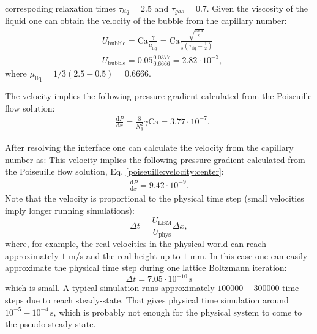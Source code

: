 \documentclass[preprint,12pt]{elsarticle}
\newcommand{\Ca}{\mathrm{Ca}}
\begin{document}
{\begin{description}
correspoding relaxation times $\tau_{liq}=2.5$ and $\tau_{gas}=0.7$. Given the viscosity of the
liquid one can obtain the velocity of the bubble from the capillary number: 
\begin{equation}
\begin{aligned}
&U_{\mathrm{bubble}}=\Ca \frac{\gamma}{\mu_{\mathrm{liq}}}=\Ca \frac{\sqrt{\frac{8 k
A}{9}}}{\frac{1}{3}(\tau_{\mathrm{liq}}-\frac{1}{2})}\\
&U_{\mathrm{bubble}}=0.05 \frac{0.0377}{0.6666}=2.82 \cdot10^{-3},
\end{aligned}
\end{equation}
where $\mu_{\mathrm{liq}}=1/3 (2.5-0.5)=0.6666$.
\item[Body force] 
  The velocity implies the following pressure gradient calculated from the
  Poiseuille flow solution:
  \begin{equation}
  \begin{aligned}
  &\frac{\mathrm{d}P}{\mathrm{d}x}=\frac{8}{N_y^2}\gamma \Ca=3.77\cdot10^{-7}.
  \end{aligned}
  \end{equation}

After resolving the interface one can  calculate the
  velocity from the capillary number as:
  This velocity implies the following pressure gradient calculated from the
  Poiseuille flow solution, Eq. \ref{poiseuille:velocity:center}: 
  \begin{equation}
  \begin{aligned}
  \frac{\mathrm{d}P}{\mathrm{d}x}=9.42 \cdot 10^{-9}.
  \end{aligned}
  \end{equation}
Note that the velocity is proportional to the physical time step (small velocities imply longer
running
simulations):
\begin{equation}
\Delta t =\frac{U_{\mathrm{LBM}}}{U_{\mathrm{phys}}} \Delta x ,
\end{equation}
where, for example, the real velocities in the physical world can reach
approximately $1$ m/s and the real height up to $1$ mm. In this case one
can easily approximate the physical time step during one lattice Boltzmann iteration:
\begin{equation}
\Delta t = 7.05 \cdot 10^{-10} \,\mathrm{s}
\end{equation}
which is small. A typical simulation runs approximately
$100000-300000$ time steps due to reach steady-state. That gives 
physical time simulation around $10^{-5}-10^{-4}\,\mathrm{s}$, which is
probably not enough for the physical system to come to the pseudo-steady state.



\end{description}}
\end{document}
